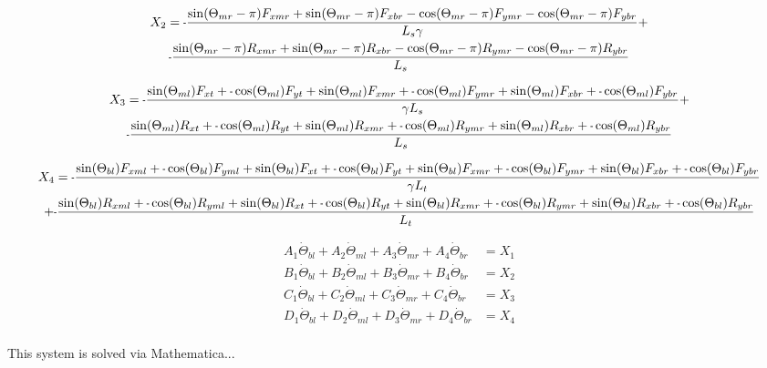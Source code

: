 \documentclass[11pt, landscape]{article}
\newcommand{\mn}{\scalebox{0.7}[1.0]{-}}
\begin{document}
\begin{multline}
  X_2 = \mn\frac{\sin(\Theta_{mr}-\pi)F_{xmr} + \sin(\Theta_{mr}-\pi)F_{xbr} - \cos(\Theta_{mr}-\pi)F_{ymr} - \cos(\Theta_{mr}-\pi)F_{ybr}}{L_{s}\gamma} + \\
  \mn\frac{\sin(\Theta_{mr}-\pi)R_{xmr} + \sin(\Theta_{mr}-\pi)R_{xbr} - \cos(\Theta_{mr}-\pi)R_{ymr} - \cos(\Theta_{mr}-\pi)R_{ybr}}{L_{s}}
\end{multline}

\begin{multline}
  X_3 = \mn \frac{\sin(\Theta_{ml})F_{xt } + \mn \cos(\Theta_{ml})F_{yt } + \sin(\Theta_{ml})F_{xmr} + \mn \cos(\Theta_{ml})F_{ymr} + \sin(\Theta_{ml})F_{xbr} + \mn \cos(\Theta_{ml})F_{ybr}}{\gamma L_s} + \\
	\mn \frac{\sin(\Theta_{ml})R_{xt } + \mn \cos(\Theta_{ml})R_{yt } + \sin(\Theta_{ml})R_{xmr} + \mn \cos(\Theta_{ml})R_{ymr} + \sin(\Theta_{ml})R_{xbr} + \mn \cos(\Theta_{ml})R_{ybr}}{L_s}
\end{multline}

\begin{multline}
  X_4 = \mn \frac{\sin(\Theta_{bl})F_{xml} + \mn\cos(\Theta_{bl})F_{yml} + \sin(\Theta_{bl})F_{xt } + \mn \cos(\Theta_{bl})F_{yt } + \sin(\Theta_{bl})F_{xmr} + \mn \cos(\Theta_{bl})F_{ymr} + \sin(\Theta_{bl})F_{xbr} + \mn \cos(\Theta_{bl})F_{ybr}}
  {\gamma L_t} \\+ \mn \frac{\sin(\Theta_{bl})R_{xml} +\mn \cos(\Theta_{bl})R_{yml} + \sin(\Theta_{bl})R_{xt } + \mn \cos(\Theta_{bl})R_{yt} + \sin(\Theta_{bl})R_{xmr} + \mn \cos(\Theta_{bl})R_{ymr} + \sin(\Theta_{bl})R_{xbr} + \mn \cos(\Theta_{bl})R_{ybr}}{L_t} \\
\end{multline}


\begin{align}
  A_1\dot{\Theta}_{bl} + A_2 \dot{\Theta}_{ml} + A_3 \dot{\Theta}_{mr} + A_4 \dot{\Theta}_{br} &= X_1 \\
  B_1\dot{\Theta}_{bl} + B_2 \dot{\Theta}_{ml} + B_3 \dot{\Theta}_{mr} + B_4 \dot{\Theta}_{br} &= X_2 \\
  C_1\dot{\Theta}_{bl} + C_2 \dot{\Theta}_{ml} + C_3 \dot{\Theta}_{mr} + C_4 \dot{\Theta}_{br} &= X_3 \\
  D_1\dot{\Theta}_{bl} + D_2 \dot{\Theta}_{ml} + D_3 \dot{\Theta}_{mr} + D_4 \dot{\Theta}_{br} &= X_4 \\
\end{align}

This system is solved via Mathematica...\\
\end{document}
